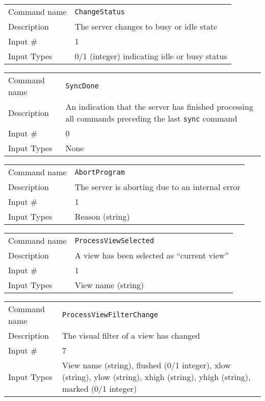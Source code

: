 \bigskip

\noindent
\begin{tabular}{l|p{5in}}
\hline
Command name & {\tt ChangeStatus} \\
Description  & The server changes to busy or idle state \\
Input \#     & 1 \\
Input Types  & 0/1 (integer) indicating idle or busy status \\
\hline
\end{tabular}

\bigskip

\noindent
\begin{tabular}{l|p{5in}}
\hline
Command name & {\tt SyncDone} \\
Description  & An indication that the server has finished processing all
               commands preceding the last {\tt sync} command \\
Input \#     & 0 \\
Input Types  & None \\
\hline
\end{tabular}

\bigskip

\noindent
\begin{tabular}{l|p{5in}}
\hline
Command name & {\tt AbortProgram} \\
Description  & The server is aborting due to an internal error \\
Input \#     & 1 \\
Input Types  & Reason (string) \\
\hline
\end{tabular}

\bigskip

\noindent
\begin{tabular}{l|p{5in}}
\hline
Command name & {\tt ProcessViewSelected} \\
Description  & A view has been selected as ``current view'' \\
Input \#     & 1 \\
Input Types  & View name (string) \\
\hline
\end{tabular}

\bigskip

\noindent
\begin{tabular}{l|p{5in}}
\hline
Command name & {\tt ProcessViewFilterChange} \\
Description  & The visual filter of a view has changed \\
Input \#     & 7 \\
Input Types  & View name (string), flushed (0/1 integer), xlow (string),
               ylow (string), xhigh (string), yhigh (string),
               marked (0/1 integer) \\
\hline
\end{tabular}

